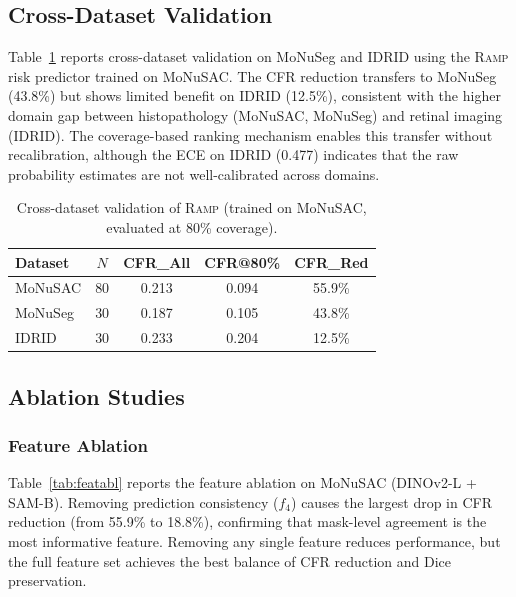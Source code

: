 \documentclass[11pt]{article}
\newcommand{\RAMP}{\textsc{Ramp}}
\begin{document}
\subsection{Cross-Dataset Validation}

Table~\ref{tab:cross} reports cross-dataset validation on MoNuSeg and IDRID
using the \RAMP{} risk predictor trained on MoNuSAC. The CFR reduction
transfers to MoNuSeg (43.8\%) but shows limited benefit on IDRID (12.5\%),
consistent with the higher domain gap between histopathology (MoNuSAC,
MoNuSeg) and retinal imaging (IDRID). The coverage-based ranking mechanism
enables this transfer without recalibration, although the ECE on IDRID
(0.477) indicates that the raw probability estimates are not well-calibrated
across domains.

\begin{table}[t]
\centering
\caption{Cross-dataset validation of \RAMP{} (trained on MoNuSAC,
  evaluated at 80\% coverage).}
\label{tab:cross}
\begin{tabular}{lcccc}
\toprule
Dataset & $N$ & CFR\_All & CFR@80\% & CFR\_Red \\
\midrule
MoNuSAC & 80 & 0.213 & 0.094 & 55.9\% \\
MoNuSeg & 30 & 0.187 & 0.105 & 43.8\% \\
IDRID   & 30 & 0.233 & 0.204 & 12.5\% \\
\bottomrule
\end{tabular}
\end{table}

\subsection{Ablation Studies}

\subsubsection{Feature Ablation}

Table~\ref{tab:featabl} reports the feature ablation on MoNuSAC
(DINOv2-L + SAM-B). Removing prediction consistency ($f_4$) causes the
largest drop in CFR reduction (from 55.9\% to 18.8\%), confirming that
mask-level agreement is the most informative feature. Removing any single
feature reduces performance, but the full feature set achieves the best
balance of CFR reduction and Dice preservation.
\end{document}
